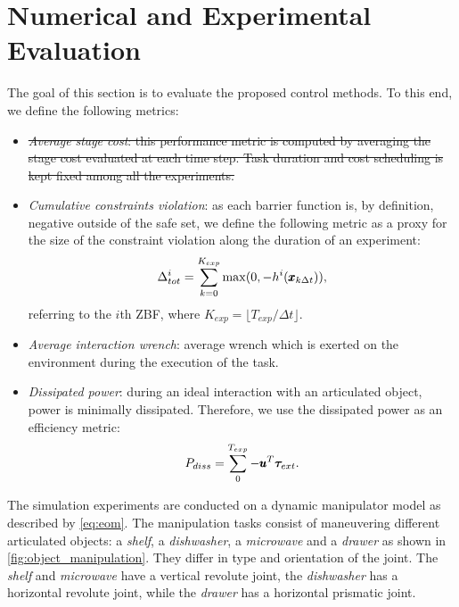 \section{Numerical and Experimental Evaluation} \label{sec:experiments}

The goal of this section is to evaluate the proposed control methods. To this end, we define the following metrics:
\begin{itemize}
    \item \sout{\textit{Average stage cost}: this performance metric is computed by averaging the stage cost evaluated at each time step. Task duration and cost scheduling is kept fixed among all the experiments.}  
    \item \textit{Cumulative constraints violation}: as each barrier function is, by definition, negative outside of the safe set, we define the following metric as a proxy for the size of the constraint violation along the duration of an experiment:
    \begin{equation*}
        \Delta^{i}_{tot} = \sum\limits_{k=0}^{K_{exp}} \max(0, -h^i(\pmb{x}_{k \Delta t})),
    \end{equation*}
    referring to the $i$th ZBF, where $K_{exp} = \lfloor T_{exp} / \Delta t \rfloor$.
    \item \textit{Average interaction wrench}: average wrench which is exerted on the environment during the execution of the task.
    \item \textit{Dissipated power}: during an ideal interaction with an articulated object, power is minimally dissipated. Therefore, we use the dissipated power as an efficiency metric:
    \begin{equation}
        P_{diss} = \sum\limits_{0}^{T_{exp}} -\pmb{u}^T \boldsymbol{\tau}_{ext}.
    \end{equation}
\end{itemize}
The simulation experiments are conducted on a dynamic manipulator model as described by \eqref{eq:eom}. The manipulation tasks consist of maneuvering different articulated objects: a \textit{shelf}, a \textit{dishwasher}, a \textit{microwave} and a \textit{drawer} as shown in \fig\ref{fig:object_manipulation}. They differ in type and orientation of the joint. The \textit{shelf} and \textit{microwave} have a vertical revolute joint, the \textit{dishwasher} has a horizontal revolute joint, while the \textit{drawer} has a horizontal prismatic joint.
  
